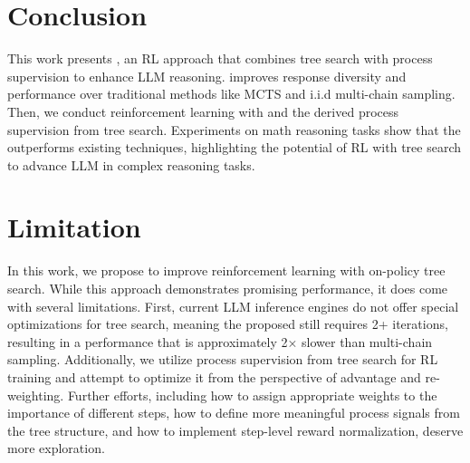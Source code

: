 \section{Conclusion}
This work presents \model, an RL approach that combines tree search with process supervision to enhance LLM reasoning. \treemodel improves response diversity and performance over traditional methods like MCTS and i.i.d multi-chain sampling. Then, we conduct reinforcement learning with \treemodel and the derived process supervision from tree search. 
Experiments on math reasoning tasks show that the \model outperforms existing techniques, highlighting the potential of RL with tree search to advance LLM in complex reasoning tasks.


\section{Limitation}
In this work, we propose to improve reinforcement learning with on-policy tree search. While this approach demonstrates promising performance, it does come with several limitations. First, current LLM inference engines do not offer special optimizations for tree search, meaning the proposed \treemodel still requires 2+ iterations, resulting in a performance that is approximately 2× slower than multi-chain sampling. Additionally, we utilize process supervision from tree search for RL training and attempt to optimize it from the perspective of advantage and re-weighting.
Further efforts, including how to assign appropriate weights to the importance of different steps, how to define more meaningful process signals from the tree structure, and how to implement step-level reward normalization, deserve more exploration.

